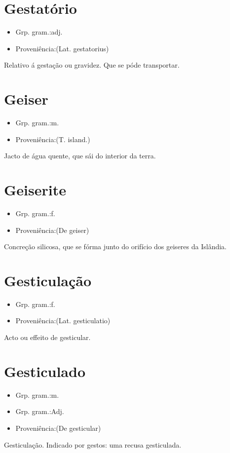 \section{Gestatório}
\begin{itemize}
\item {Grp. gram.:adj.}
\end{itemize}
\begin{itemize}
\item {Proveniência:(Lat. \textunderscore gestatorius\textunderscore )}
\end{itemize}
Relativo á gestação ou gravidez.
Que se póde transportar.
\section{Geiser}
\begin{itemize}
\item {Grp. gram.:m.}
\end{itemize}
\begin{itemize}
\item {Proveniência:(T. island.)}
\end{itemize}
Jacto de água quente, que sái do interior da terra.
\section{Geiserite}
\begin{itemize}
\item {Grp. gram.:f.}
\end{itemize}
\begin{itemize}
\item {Proveniência:(De \textunderscore geiser\textunderscore )}
\end{itemize}
Concreção silicosa, que se fórma junto do orifício dos geiseres da Islândia.
\section{Gesticulação}
\begin{itemize}
\item {Grp. gram.:f.}
\end{itemize}
\begin{itemize}
\item {Proveniência:(Lat. \textunderscore gesticulatio\textunderscore )}
\end{itemize}
Acto ou effeito de gesticular.
\section{Gesticulado}
\begin{itemize}
\item {Grp. gram.:m.}
\end{itemize}
\begin{itemize}
\item {Grp. gram.:Adj.}
\end{itemize}
\begin{itemize}
\item {Proveniência:(De \textunderscore gesticular\textunderscore )}
\end{itemize}
Gesticulação.
Indicado por gestos: \textunderscore uma recusa gesticulada\textunderscore .
